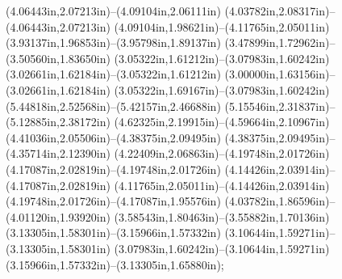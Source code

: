 (4.06443in,2.07213in)--(4.09104in,2.06111in) (4.03782in,2.08317in)--(4.06443in,2.07213in) (4.09104in,1.98621in)--(4.11765in,2.05011in) (3.93137in,1.96853in)--(3.95798in,1.89137in) (3.47899in,1.72962in)--(3.50560in,1.83650in) (3.05322in,1.61212in)--(3.07983in,1.60242in) (3.02661in,1.62184in)--(3.05322in,1.61212in) (3.00000in,1.63156in)--(3.02661in,1.62184in) (3.05322in,1.69167in)--(3.07983in,1.60242in) (5.44818in,2.52568in)--(5.42157in,2.46688in) (5.15546in,2.31837in)--(5.12885in,2.38172in) (4.62325in,2.19915in)--(4.59664in,2.10967in) (4.41036in,2.05506in)--(4.38375in,2.09495in) (4.38375in,2.09495in)--(4.35714in,2.12390in) (4.22409in,2.06863in)--(4.19748in,2.01726in) (4.17087in,2.02819in)--(4.19748in,2.01726in) (4.14426in,2.03914in)--(4.17087in,2.02819in) (4.11765in,2.05011in)--(4.14426in,2.03914in) (4.19748in,2.01726in)--(4.17087in,1.95576in) (4.03782in,1.86596in)--(4.01120in,1.93920in) (3.58543in,1.80463in)--(3.55882in,1.70136in) (3.13305in,1.58301in)--(3.15966in,1.57332in) (3.10644in,1.59271in)--(3.13305in,1.58301in) (3.07983in,1.60242in)--(3.10644in,1.59271in) (3.15966in,1.57332in)--(3.13305in,1.65880in);
